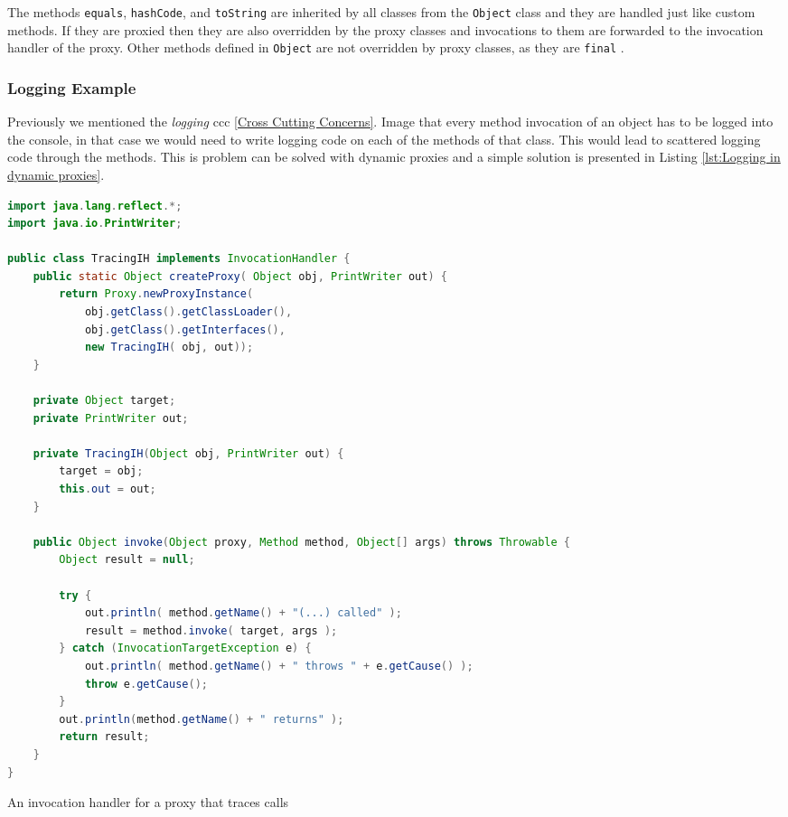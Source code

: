 The methods \texttt{equals}, \texttt{hashCode}, and \texttt{toString} are inherited by all classes from the \texttt{Object} class and they are handled just like custom methods.
If they are proxied then they are also overridden by the proxy classes and invocations to them are forwarded to the invocation handler of the proxy. 
Other methods defined in \texttt{Object} are not overridden by proxy classes, as they are \texttt{final} \cite{eugster2006uniform}.

\subsubsection{Logging Example}
Previously we mentioned the \textit{logging} \ac{ccc} \ref{Cross Cutting Concerns}.
Image that every method invocation of an object has to be logged into the console, in that case we would need to write logging code on each of the methods of that class.
This would lead to scattered logging code through the methods.
This is problem can be solved with dynamic proxies and a simple solution is presented in Listing \ref{lst:Logging in dynamic proxies}.

\begin{sourcecode}[H]
	\begin{lstlisting}[language=Java]
import java.lang.reflect.*;
import java.io.PrintWriter;

public class TracingIH implements InvocationHandler {
    public static Object createProxy( Object obj, PrintWriter out) {
        return Proxy.newProxyInstance(
            obj.getClass().getClassLoader(),
            obj.getClass().getInterfaces(),
            new TracingIH( obj, out));
    }

    private Object target;
    private PrintWriter out;

    private TracingIH(Object obj, PrintWriter out) {
        target = obj;
        this.out = out;
    }

    public Object invoke(Object proxy, Method method, Object[] args) throws Throwable {
        Object result = null;

        try {
            out.println( method.getName() + "(...) called" );
            result = method.invoke( target, args );
        } catch (InvocationTargetException e) {
            out.println( method.getName() + " throws " + e.getCause() );
            throw e.getCause();
        }
        out.println(method.getName() + " returns" );
        return result;
    }
}	

	\end{lstlisting}
	\caption{An invocation handler for a proxy that traces calls \cite{forman2004java}}
	\label{lst:Logging in dynamic proxies}
\end{sourcecode}


